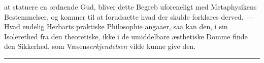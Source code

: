 \documentclass[12pt,a4paper]{book}
\newcommand{\divrule}{\begin{center}\rule{2cm}{0.4pt}\end{center}}
\begin{document}
at statuere en ordnende Gud, bliver dette Begreb uforeneligt
med Metaphysikens Bestemmelser, og kommer til at forudsætte
hvad der skulde forklares derved. --- Hvad endelig Herbarts
praktiske Philosophie angaaer, saa kan den, i sin Isolerethed
fra den theoretiske, ikke i de umiddelbare æsthetiske Domme
finde den Sikkerhed, som Væsens\emph{erkjendelsen} vilde kunne
give den.

\divrule
\end{document}
